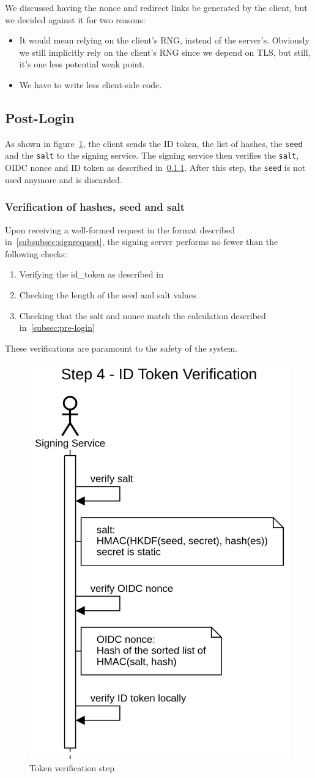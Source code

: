 We discussed having the nonce and redirect links be generated by the client,
but we decided against it for two reasons:
\begin{itemize}
    \item It would mean relying on the client's \gls{RNG}, instead of the server's.
    Obviously we still implicitly rely on the client's \gls{RNG} since we depend on \gls{TLS},
    but still, it's one less potential weak point.
    \item We have to write less client-side code.
\end{itemize}

\subsection{Post-Login}\label{subsec:post-login}
As shown in figure~\ref{fig:tokenverificationstep},
the client sends the ID token, the list of hashes, the \texttt{seed} and the \texttt{salt} to the signing service.
The signing service then verifies the \texttt{salt}, OIDC nonce and ID token as described in~\ref{subsubsec:verificationhashesseedsalt}.
After this step, the \texttt{seed} is not used anymore and is discarded.


\subsubsection{Verification of hashes, seed and salt}\label{subsubsec:verificationhashesseedsalt}
Upon receiving a well-formed request in the format described in~\ref{subsubsec:signrequest},
the signing server performs no fewer than the following checks:
\begin{enumerate}
    \item Verifying the id\_token as described in~\cite[Section~7.2]{rfc7519}
    \item Checking the length of the seed and salt values
    \item Checking that the salt and nonce match the calculation described in~\ref{subsec:pre-login}
\end{enumerate}
These verifications are paramount to the safety of the system.

\begin{figure}[h]
    \begin{center}
        \includegraphics[width=0.35\linewidth]{images/protocol_step4_id_token_verification.png}
        \caption{Token verification step}
        \label{fig:tokenverificationstep}
    \end{center}
\end{figure}

